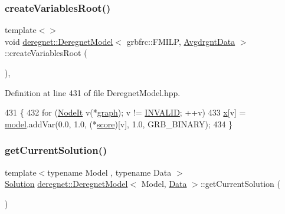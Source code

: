 \subsubsection{\texorpdfstring{create\+Variables\+Root()}{createVariablesRoot()}\hspace{0.1cm}{\footnotesize\ttfamily [3/3]}}
{\footnotesize\ttfamily template$<$$>$ \\
void \hyperlink{classderegnet_1_1DeregnetModel}{deregnet\+::\+Deregnet\+Model}$<$ grbfrc\+::\+F\+M\+I\+LP, \hyperlink{classderegnet_1_1AvgdrgntData}{Avgdrgnt\+Data} $>$\+::create\+Variables\+Root (\begin{DoxyParamCaption}{ }\end{DoxyParamCaption})\hspace{0.3cm}{\ttfamily [inline]}, {\ttfamily [private]}}



Definition at line 431 of file Deregnet\+Model.\+hpp.


\begin{DoxyCode}
431                                                                    \{
432     \textcolor{keywordflow}{for} (\hyperlink{namespacederegnet_ac34314e1b5f456fc6d1bb9d96316de4a}{NodeIt} v(*\hyperlink{classderegnet_1_1DeregnetModel_a3cd2f54b8e061ef5bed32708d9bc1ef1}{graph}); v != \hyperlink{usinglemon_8hpp_adf770fe2eec438e3758ffe905dbae208}{INVALID}; ++v)
433         \hyperlink{classderegnet_1_1DeregnetModel_a360c980f3fec4dfbab50e9bb06a933a8}{x}[v] = \hyperlink{classderegnet_1_1DeregnetModel_a30d525de2086e342b33fe3e45ede4947}{model}.addVar(0.0, 1.0, (*\hyperlink{classderegnet_1_1DeregnetModel_a46224b0bda5bab796d3b7cb41c184a4d}{score})[v], 1.0, GRB\_BINARY);
434 \}
\end{DoxyCode}
\mbox{\label{classderegnet_1_1DeregnetModel_a51e1c5476b2425a143908609e75d098a}} 
\subsubsection{\texorpdfstring{get\+Current\+Solution()}{getCurrentSolution()}}
{\footnotesize\ttfamily template$<$typename Model , typename Data $>$ \\
\hyperlink{structderegnet_1_1Solution}{Solution} \hyperlink{classderegnet_1_1DeregnetModel}{deregnet\+::\+Deregnet\+Model}$<$ Model, \hyperlink{avgdrgnt_8cpp_a1d1235306db276e9b36acba1db1509e8}{Data} $>$\+::get\+Current\+Solution (\begin{DoxyParamCaption}{ }\end{DoxyParamCaption})}

